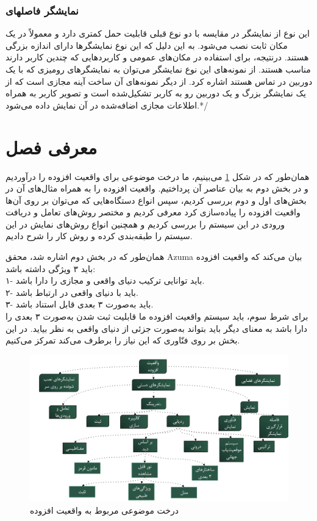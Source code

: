 \subsubsection{نمایشگر فاصلهای}
این نوع از نمایشگر در مقایسه با دو نوع قبلی قابلیت حمل کمتری دارد و معمولاً در یک مکان ثابت نصب می‌شود. به این دلیل که این نوع نمایشگرها دارای اندازه بزرگی هستند. درنتیجه، برای استفاده در مکان‌های عمومی و کاربردهایی که چندین کاربر دارند مناسب هستند. از نمونه‌های این نوع نمایشگر می‌توان به نمایشگرهای رومیزی که با یک دوربین در تماس هستند اشاره کرد. از دیگر نمونه‌های آن ساخت آینه مجازی است که از یک نمایشگر بزرگ و یک دوربین رو به کاربر تشکیل‌شده است و تصویر کاربر به همراه اطلاعات مجازی اضافه‌شده در آن نمایش داده می‌شود\cite{Billinghurst}.*/



\section{معرفی فصل}
همان‌طور که در شکل \ref{fig:tree} می‌بینیم، ما درخت موضوعی برای واقعیت افزوده را درآوردیم و در بخش دوم به بیان عناصر آن پرداختیم.
واقعیت افزوده را به همراه مثال‌های آن در بخش‌های اول و دوم بررسی کردیم، سپس انواع دستگاه‌هایی که می‌توان بر روی آن‌ها واقعیت افزوده را پیاده‌سازی کرد معرفی کردیم و مختصر روش‌های تعامل و دریافت ورودی در این سیستم را بررسی کردیم و همچنین انواع روش‌های نمایش در این سیستم را طبقه‌بندی کرده و روش کار را شرح دادیم.

همان‌طور که در بخش دوم اشاره شد، محقق Azuma بیان می‌کند که واقعیت افزوده باید ۳ ویژگی داشته باشد\cite{Azuma}:
\\
۱- باید توانایی ترکیب دنیای واقعی و مجازی را دارا باشد.
\\
۲- باید با دنیای واقعی در ارتباط باشد.
\\
۳- باید به‌صورت ۳ بعدی قابل استناد باشد.
\\
برای شرط سوم، باید سیستم واقعیت افزوده ما قابلیت ثبت شدن به‌صورت ۳ بعدی را دارا باشد به معنای دیگر باید بتواند به‌صورت جزئی از دنیای واقعی به نظر بیاید. در این بخش ‌بر روی فنّاوری که این نیاز را برطرف می‌کند تمرکز می‌کنیم.
\begin{figure}
	\centering
	\includegraphics[width=1\linewidth]{image/tree}
	\caption {درخت موضوعی مربوط به واقعیت افزوده}
	\label{fig:tree}
\end{figure}
